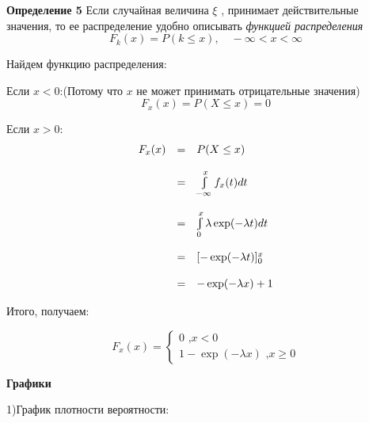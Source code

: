 \documentclass[a4paper,12pt, oneside]{book}
\let\int\varint
\begin{document}
	\normalsize{\textbf{Определение 5} Если случайная  величина $\xi$ , принимает действительные значения, то ее распределение удобно описывать  \textit{ функцией распределения }
	$$
		F_k(x) = P(k \le x), \quad -\infty < x < \infty
	$$
	
	
	\vspace{\baselineskip}
	Найдем функцию распределения:
	
	Если $x < 0$:(Потому что $x$ не может принимать отрицательные значения)
	$$
	F_x(x) = P(X \le x) = 0
	$$
	
	Если $x > 0$:
	$$
	\begin{array}{rcl}
	F_x(x) &=& P(X \le x)\\
	\\
	&=& \int\limits_{-\infty}^{x}f_x(t)dt\\
	\\
	&=& \int\limits_{0}^{x} \lambda\exp(-\lambda t)dt\\
	\\
	&=&[-\exp(-\lambda t)]_0^x\\
	\\
	&=&-\exp(-\lambda x) + 1
	\end{array}	
	$$
	
	Итого, получаем:
	

	\begin{equation*}
	F_x(x) = 
		\begin{cases}
			0 \text{	,$x < 0$}\\
			1 - \exp(-\lambda x) \text{		,$x \ge 0$}
		\end{cases}
	\end{equation*}
	

	\vspace{5mm}
	\large{\textbf{{Графики}}}
	\vspace{5mm}	
			
	1)График плотности вероятности:

	\begin{minipage}[h]{0.55\linewidth}
	\end{minipage}
	\\
	\vspace{\baselineskip}\\
	
}
\end{document}
